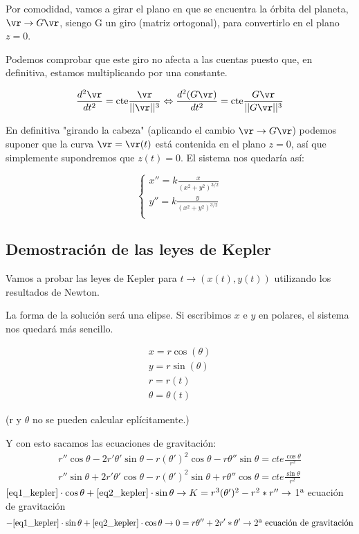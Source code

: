 Por comodidad, vamos a girar el plano en que se encuentra la órbita del planeta, $\vr \rightarrow G\vr$, siengo G un giro (matriz ortogonal), para convertirlo en el plano $z=0$.

Podemos comprobar que este giro no afecta a las cuentas puesto que, en definitiva, estamos multiplicando por una constante.

$$\frac{d^2\vr}{dt^2} = \text{cte}\frac{\vr}{||\vr||^3} \Leftrightarrow \frac{d^2(G\vr)}{dt^2} = \text{cte}\frac{G\vr}{||G\vr||^3}$$

En definitiva "girando la cabeza" (aplicando el cambio $\vr \rightarrow G\vr$) podemos suponer que la curva $\vr = \vr(t)$ está contenida en el plano $z = 0$, así que simplemente supondremos que $z(t) = 0$. El sistema nos quedaría así:


$$
\begin{cases}
 x'' = k\frac{x}{(x^2 + y^2)^{3/2}}\\
 y'' = k\frac{y}{(x^2 + y^2)^{3/2}}\\
\end{cases}
$$

\subsection{Demostración de las leyes de Kepler}

Vamos a probar las leyes de Kepler para $t \rightarrow (x(t), y(t))$ utilizando los resultados de Newton.

La forma de la solución será una elipse.
Si escribimos $x$ e $y$ en polares, el sistema nos quedará más sencillo.

$$\begin{array}{c}
x = r\cos(\theta)\\
y = r\sin(\theta) \\
r = r(t) \\
\theta = \theta(t)
\end{array}
$$

(r y $\theta$ no se pueden calcular eplícitamente.)

Y con esto sacamos las ecuaciones de gravitación:
\begin{gather}
r''\cos\theta - 2r'\theta'\sin\theta - r(\theta')^2\cos\theta - r\theta''\sin\theta = cte \frac{\cos\theta}{r^2} \label{eq1_kepler}\\
r''\sin\theta + 2r'\theta'\cos\theta - r(\theta')^2\sin\theta + r\theta''\cos\theta = cte \frac{\sin\theta}{r^2} \label{eq2_kepler}
\end{gather}
$\eqref{eq1_kepler}\cdot\cos\theta + \eqref{eq2_kepler}\cdot\sin\theta \rightarrow K= r^3(\theta')^2 - r^2*r'' \rightarrow$ 1ª ecuación de gravitación
$$-\eqref{eq1_kepler}\cdot\sin\theta + \eqref{eq2_kepler}\cdot\cos\theta \rightarrow 0= r \theta'' + 2r' * \theta' \rightarrow \text{2ª ecuación de gravitación}$$


